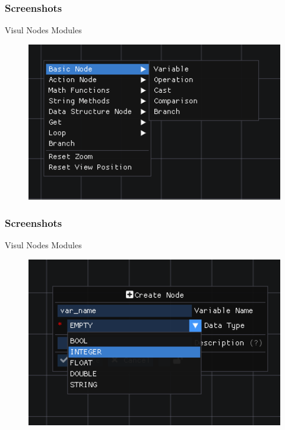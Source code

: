 \documentclass{beamer}
\begin{document}
\begin{frame}
	\frametitle{Screenshots}
	\begin{block}{Visul Nodes Modules}
		\begin{figure}
			\includegraphics[width=1\textwidth]{../tex/media/sc_node_interface_context.png}
		\end{figure}
	\end{block}
\end{frame}

\begin{frame}
	\frametitle{Screenshots}
	\begin{block}{Visul Nodes Modules}
		\begin{figure}
			\includegraphics[width=1\textwidth]{../tex/media/sc_node_creation_sample.png}
		\end{figure}
	\end{block}
\end{frame}
\end{document}
